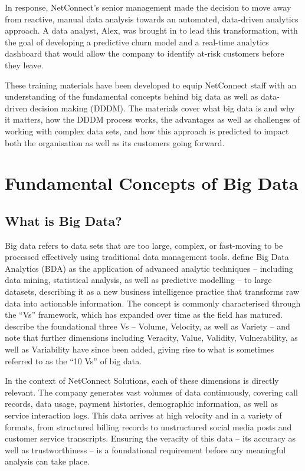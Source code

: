 \documentclass[12pt,a4paper]{article}
\begin{document}
In response, NetConnect's senior management made the decision to move away from reactive, manual data analysis towards an automated, data-driven analytics approach. A data analyst, Alex, was brought in to lead this transformation, with the goal of developing a predictive churn model and a real-time analytics dashboard that would allow the company to identify at-risk customers before they leave.

These training materials have been developed to equip NetConnect staff with an understanding of the fundamental concepts behind big data as well as data-driven decision making (DDDM). The materials cover what big data is and why it matters, how the DDDM process works, the advantages as well as challenges of working with complex data sets, and how this approach is predicted to impact both the organisation as well as its customers going forward.

\newpage
\section{Fundamental Concepts of Big Data}

\subsection{What is Big Data?}

Big data refers to data sets that are too large, complex, or fast-moving to be processed effectively using traditional data management tools. \textcite{Sabharwal2021} define Big Data Analytics (BDA) as the application of advanced analytic techniques -- including data mining, statistical analysis, as well as predictive modelling -- to large datasets, describing it as a new business intelligence practice that transforms raw data into actionable information. The concept is commonly characterised through the ``Vs'' framework, which has expanded over time as the field has matured. \textcite{Gahar2024} describe the foundational three Vs -- Volume, Velocity, as well as Variety -- and note that further dimensions including Veracity, Value, Validity, Vulnerability, as well as Variability have since been added, giving rise to what is sometimes referred to as the ``10 Vs'' of big data.

In the context of NetConnect Solutions, each of these dimensions is directly relevant. The company generates vast volumes of data continuously, covering call records, data usage, payment histories, demographic information, as well as service interaction logs. This data arrives at high velocity and in a variety of formats, from structured billing records to unstructured social media posts and customer service transcripts. Ensuring the veracity of this data -- its accuracy as well as trustworthiness -- is a foundational requirement before any meaningful analysis can take place.
\end{document}
